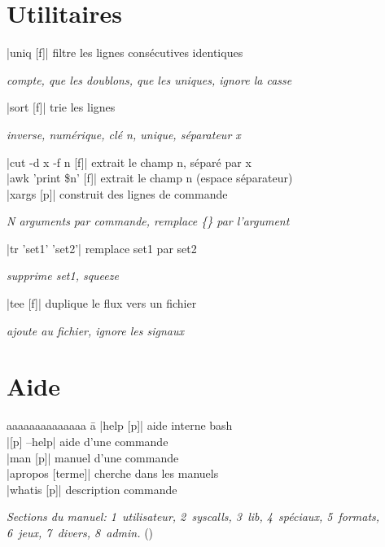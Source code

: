 \documentclass{article}
\newenvironment{cmdblock}{%
  \par\setlength{\parindent}{0pt}\setlength{\parskip}{0pt}%
  \RaggedRight%
}{\par}
\newlength{\cmdoptindent}
\newcommand{\cmdopt}[1]{%
  \hspace*{\cmdoptindent}%
  \begin{minipage}[t]{\dimexpr\linewidth-\cmdoptindent\relax}
    \RaggedRight \itshape #1%
  \end{minipage}\par
}
\begin{document}
\begin{multicols}{4}
    \section*{Utilitaires}
    \begin{cmdblock}
        \code|uniq [f]| \quad filtre les lignes consécutives identiques \\
        \cmdopt{ compte,  que les doublons,
            \codx{-u} que les uniques, \codx{-i} ignore la casse}
        \code|sort [f]| \quad trie les lignes \\
        \cmdopt{ inverse,  numérique,
            \codx{-k n} clé n, \codx{-u} unique,
            \codx{-t x} séparateur x}
        \code|cut -d x -f n [f]| \quad extrait le champ n, séparé par x \\
        \code|awk '{print \$n}' [f]| \quad extrait le champ n (espace séparateur) \\
        \code|xargs [p]| \quad construit des lignes de commande \\
        \cmdopt{ N arguments par commande,
            \codx{-I \{\}} remplace \{\} par l'argument}
        \code|tr 'set1' 'set2'| \quad remplace set1 par set2 \\
        \cmdopt{ supprime set1,  squeeze}
        \code|tee [f]| \quad duplique le flux vers un fichier \\
        \cmdopt{ ajoute au fichier,  ignore les signaux}
    \end{cmdblock}

    \section*{Aide}
    \begin{tabbing}
        aaaaaaaaaaaaaa \= a \kill
        \code|help [p]| \> aide interne bash \\
        \code|[p] --help| \> aide d'une commande \\
        \code|man [p]| \> manuel d'une commande \\
        \code|apropos [terme]| \> cherche dans les manuels \\
        \code|whatis [p]| \> description commande
    \end{tabbing}

    \emph{Sections du manuel: 1~utilisateur, 2~syscalls, 3~lib, 4~spéciaux, 5~formats, 6~jeux, 7~divers, 8~admin.} ()


\end{multicols}
\end{document}
